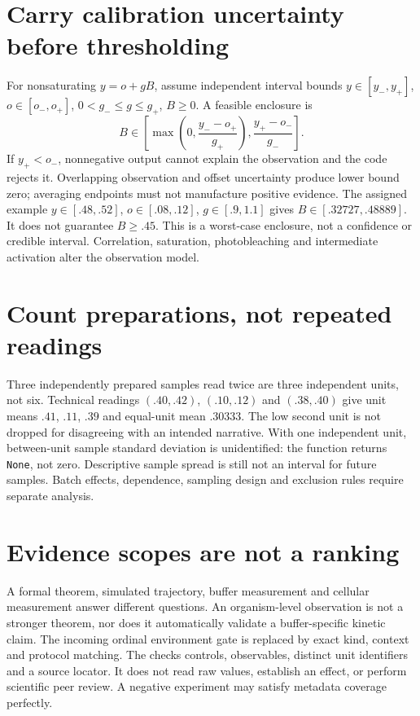 \section{Carry calibration uncertainty before thresholding}
For nonsaturating $y=o+gB$, assume independent interval bounds
$y\in[y_-,y_+]$, $o\in[o_-,o_+]$, $0<g_-\le g\le g_+$, $B\ge0$.
A feasible enclosure is
\begin{equation}
 B\in\left[\max\left(0,\frac{y_--o_+}{g_+}\right),
                 \frac{y_+-o_-}{g_-}\right].
 \label{eq:dna31-calibration}
\end{equation}
If $y_+<o_-$, nonnegative output cannot explain the observation and the code
rejects it. Overlapping observation and offset uncertainty produce lower bound
zero; averaging endpoints must not manufacture positive evidence.
The assigned example $y\in[.48,.52]$, $o\in[.08,.12]$, $g\in[.9,1.1]$ gives
$B\in[.32727,.48889]$. It does not guarantee $B\ge.45$.
This is a worst-case enclosure, not a confidence or credible interval.
Correlation, saturation, photobleaching and intermediate activation alter the
observation model.

\section{Count preparations, not repeated readings}
Three independently prepared samples read twice are three independent units,
not six. Technical readings $(.40,.42)$, $(.10,.12)$ and $(.38,.40)$ give
unit means $.41$, $.11$, $.39$ and equal-unit mean $.30333$.
The low second unit is not dropped for disagreeing with an intended narrative.
With one independent unit, between-unit sample standard deviation is unidentified:
the function returns \texttt{None}, not zero. Descriptive sample spread is still
not an interval for future samples. Batch effects, dependence, sampling design
and exclusion rules require separate analysis.

\section{Evidence scopes are not a ranking}
A formal theorem, simulated trajectory, buffer measurement and cellular
measurement answer different questions. An organism-level observation is not a
stronger theorem, nor does it automatically validate a buffer-specific kinetic
claim. The incoming ordinal environment gate is replaced by exact kind, context
and protocol matching.
The  checks controls, observables, distinct unit
identifiers and a source locator. It does not read raw values, establish an
effect, or perform scientific peer review. A negative experiment may satisfy
metadata coverage perfectly.

